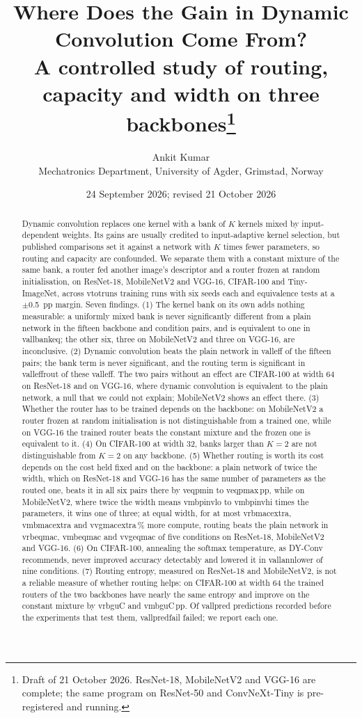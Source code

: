 \documentclass[10pt,a4paper]{article}
\title{\vspace{-1.3cm}\textbf{Where Does the Gain in Dynamic Convolution Come From?}\\[3pt]
\large A controlled study of routing, capacity and width on three backbones\thanks{Draft of 21 October 2026. ResNet-18, MobileNetV2 and VGG-16 are complete; the same program on ResNet-50 and ConvNeXt-Tiny is pre-registered and running.}}
\author{Ankit Kumar\\\small Mechatronics Department, University of Agder, Grimstad, Norway}
\date{\small 24 September 2026; revised 21 October 2026}
\newcommand{\V}[1]{\csname v#1\endcsname}
\begin{document}
\maketitle
\vspace{-0.6cm}

\begin{abstract}
\noindent
Dynamic convolution replaces one kernel with a bank of $K$ kernels mixed
by input-dependent weights. Its gains are usually credited to
input-adaptive kernel selection, but published comparisons set it against
a network with $K$ times fewer parameters, so routing and capacity are
confounded. We separate them with a constant mixture of the same bank, a
router fed another image's descriptor and a router frozen at random
initialisation, on ResNet-18, MobileNetV2 and VGG-16, CIFAR-100 and
Tiny-ImageNet, across \V{totruns} training runs with six seeds each and
equivalence tests at a $\pm$\SI{0.5}{pp} margin. Seven findings. (1) The
kernel bank on its own adds nothing measurable: a uniformly mixed bank is
never significantly different from a plain network in the fifteen
backbone and condition pairs, and is equivalent to one in \V{allbankeq};
the other six, three on MobileNetV2 and three on VGG-16, are
inconclusive. (2) Dynamic convolution beats the plain network in
\V{alleff} of the fifteen pairs; the bank term is never significant, and
the routing term is significant in \V{alleffrout} of these \V{alleff}. The
two pairs without an effect are CIFAR-100 at width 64 on ResNet-18 and on
VGG-16, where dynamic convolution is equivalent to the plain network, a
null that we could not explain; MobileNetV2 shows an effect there. (3) Whether the router has to be trained depends on the
backbone: on MobileNetV2 a router frozen at random initialisation is not
distinguishable from a trained one, while on VGG-16 the trained router
beats the constant mixture and the frozen one is equivalent to it. (4) On
CIFAR-100 at width 32, banks larger than $K=2$ are not distinguishable
from $K=2$ on any backbone. (5) Whether routing is worth its cost depends
on the cost held fixed and on the backbone: a plain network of twice the
width, which on ResNet-18 and VGG-16 has the same number of parameters as
the routed one, beats it in all six pairs there by \V{eqpmin} to
\V{eqpmax}\,pp, while on MobileNetV2, where twice the width means
\V{mbpinvlo} to \V{mbpinvhi} times the parameters, it wins one of three;
at equal width, for at most \V{rbmacextra}, \V{mbmacextra} and
\V{vgmacextra}\,\% more compute, routing beats the plain network in
\V{rbeqmac}, \V{mbeqmac} and \V{vgeqmac} of five conditions on ResNet-18,
MobileNetV2 and VGG-16. (6) On CIFAR-100, annealing the softmax
temperature, as DY-Conv recommends, never improved accuracy detectably
and lowered it in \V{allannlower} of nine conditions. (7) Routing entropy,
measured on ResNet-18 and MobileNetV2, is not a reliable measure of
whether routing helps: on CIFAR-100 at width 64 the trained routers of
the two backbones have nearly the same entropy and improve on the
constant mixture by \V{rbguC} and \V{mbguC}\,pp. Of \V{allpred}
predictions recorded before the experiments that test them,
\V{allpredfail} failed; we report each one.
\end{abstract}
\end{document}
